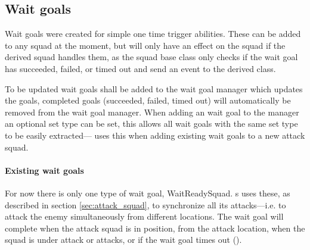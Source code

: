 \subsection{Wait goals}
\label{sec:wait_goals}
Wait goals were created for simple one time trigger abilities. These can be added to any squad at the moment, but will only have an effect on the squad if the derived squad handles them, as the squad base class only checks if the wait goal has succeeded, failed, or timed out and send an event to the derived class.

To be updated wait goals shall be added to the wait goal manager which updates the goals, completed goals (succeeded, failed, timed out) will automatically be removed from the wait goal manager. When adding an wait goal to the manager an optional set type can be set, this allows all wait goals with the same set type to be easily extracted— uses this when adding existing wait goals to a new attack squad.

\paragraph{Existing wait goals}
For now there is only one type of wait goal, WaitReadySquad. s uses these, as described in section \ref{sec:attack_squad}, to synchronize all its attacks—i.e. to attack the enemy simultaneously from different locations. The wait goal will complete when the attack squad is in position, \squadAttackWaitingPositionDistanceFromGoal from the attack location, when the squad is under attack or attacks, or if the wait goal times out (\attackCoordinatorWaitGoalTimeout).

